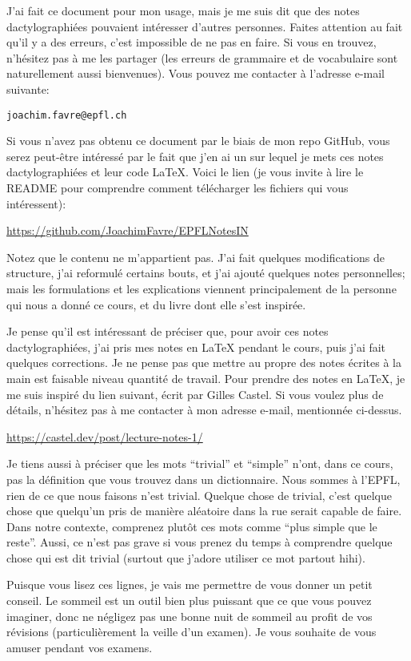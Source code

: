 J'ai fait ce document pour mon usage, mais je me suis dit que des notes dactylographiées pouvaient intéresser d'autres personnes. Faites attention au fait qu'il y a des erreurs, c'est impossible de ne pas en faire. Si vous en trouvez, n'hésitez pas à me les partager (les erreurs de grammaire et de vocabulaire sont naturellement aussi bienvenues). Vous pouvez me contacter à l'adresse e-mail suivante:
\begin{center}
    \texttt{joachim.favre@epfl.ch}
\end{center}

Si vous n'avez pas obtenu ce document par le biais de mon repo GitHub, vous serez peut-être intéressé par le fait que j'en ai un sur lequel je mets ces notes dactylographiées et leur code \LaTeX{}. Voici le lien (je vous invite à lire le README pour comprendre comment télécharger les fichiers qui vous intéressent):
\begin{center}
    \url{https://github.com/JoachimFavre/EPFLNotesIN}
\end{center}

Notez que le contenu ne m'appartient pas. J'ai fait quelques modifications de structure, j'ai reformulé certains bouts, et j'ai ajouté quelques notes personnelles; mais les formulations et les explications viennent principalement de la personne qui nous a donné ce cours, et du livre dont elle s'est inspirée.

Je pense qu'il est intéressant de préciser que, pour avoir ces notes dactylographiées, j'ai pris mes notes en \LaTeX{} pendant le cours, puis j'ai fait quelques corrections. Je ne pense pas que mettre au propre des notes écrites à la main est faisable niveau quantité de travail. Pour prendre des notes en \LaTeX{}, je me suis inspiré du lien suivant, écrit par Gilles Castel. Si vous voulez plus de détails, n'hésitez pas à me contacter à mon adresse e-mail, mentionnée ci-dessus.
\begin{center}
    \url{https://castel.dev/post/lecture-notes-1/}
\end{center}

Je tiens aussi à préciser que les mots ``trivial'' et ``simple'' n'ont, dans ce cours, pas la définition que vous trouvez dans un dictionnaire. Nous sommes à l'EPFL, rien de ce que nous faisons n'est trivial. Quelque chose de trivial, c'est quelque chose que quelqu'un pris de manière aléatoire dans la rue serait capable de faire. Dans notre contexte, comprenez plutôt ces mots comme ``plus simple que le reste''. Aussi, ce n'est pas grave si vous prenez du temps à comprendre quelque chose qui est dit trivial (surtout que j'adore utiliser ce mot partout hihi).

Puisque vous lisez ces lignes, je vais me permettre de vous donner un petit conseil. Le sommeil est un outil bien plus puissant que ce que vous pouvez imaginer, donc ne négligez pas une bonne nuit de sommeil au profit de vos révisions (particulièrement la veille d'un examen). Je vous souhaite de vous amuser pendant vos examens.

